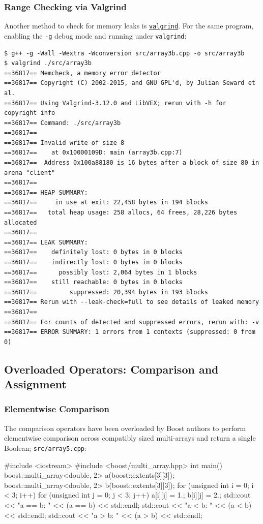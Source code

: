 \documentclass[12pt,letterpaper,twoside]{article}
\begin{document}
\subsubsection{Range Checking via Valgrind}
Another method to check for memory leaks is 
\href{https://en.wikipedia.org/wiki/Valgrind}{\texttt{valgrind}}.
For the same program, enabling the \texttt{-g} debug mode and running under \texttt{valgrind}:

{\footnotesize
\begin{verbatim}
$ g++ -g -Wall -Wextra -Wconversion src/array3b.cpp -o src/array3b
$ valgrind ./src/array3b
==36817== Memcheck, a memory error detector
==36817== Copyright (C) 2002-2015, and GNU GPL'd, by Julian Seward et al.
==36817== Using Valgrind-3.12.0 and LibVEX; rerun with -h for copyright info
==36817== Command: ./src/array3b
==36817== 
==36817== Invalid write of size 8
==36817==    at 0x10000109D: main (array3b.cpp:7)
==36817==  Address 0x100a88180 is 16 bytes after a block of size 80 in arena "client"
==36817== 
==36817== HEAP SUMMARY:
==36817==     in use at exit: 22,458 bytes in 194 blocks
==36817==   total heap usage: 258 allocs, 64 frees, 28,226 bytes allocated
==36817== 
==36817== LEAK SUMMARY:
==36817==    definitely lost: 0 bytes in 0 blocks
==36817==    indirectly lost: 0 bytes in 0 blocks
==36817==      possibly lost: 2,064 bytes in 1 blocks
==36817==    still reachable: 0 bytes in 0 blocks
==36817==         suppressed: 20,394 bytes in 193 blocks
==36817== Rerun with --leak-check=full to see details of leaked memory
==36817== 
==36817== For counts of detected and suppressed errors, rerun with: -v
==36817== ERROR SUMMARY: 1 errors from 1 contexts (suppressed: 0 from 0)
\end{verbatim}
}

\subsection{Overloaded Operators: Comparison and Assignment}
\subsubsection{Elementwise Comparison} The comparison operators have been overloaded by 
Boost authors to perform elementwise comparison across compatibly sized multi-arrays and return
a single Boolean;
\texttt{src/array5.cpp}:

\begin{cpp}
#include <iostream>
#include <boost/multi_array.hpp>
int main() {
  boost::multi_array<double, 2> a(boost::extents[3][3]);
  boost::multi_array<double, 2> b(boost::extents[3][3]);
  for (unsigned int i = 0; i < 3; i++) {
    for (unsigned int j = 0; j < 3; j++) {
      a[i][j] = 1.;
      b[i][j] = 2.;
    }
  }
  std::cout << "a == b: " << (a == b) << std::endl;
  std::cout << "a  < b: " << (a  < b) << std::endl;
  std::cout << "a  > b: " << (a  > b) << std::endl;
}
\end{cpp}
\end{document}
